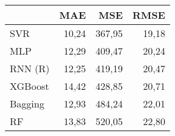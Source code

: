 \begin{tabular}{lrrr}
\toprule
 & MAE & MSE & RMSE \\
\midrule
SVR & 10,24 & 367,95 & 19,18 \\
MLP & 12,29 & 409,47 & 20,24 \\
RNN (R) & 12,25 & 419,19 & 20,47 \\
XGBoost & 14,42 & 428,85 & 20,71 \\
Bagging & 12,93 & 484,24 & 22,01 \\
RF & 13,83 & 520,05 & 22,80 \\
\bottomrule
\end{tabular}
